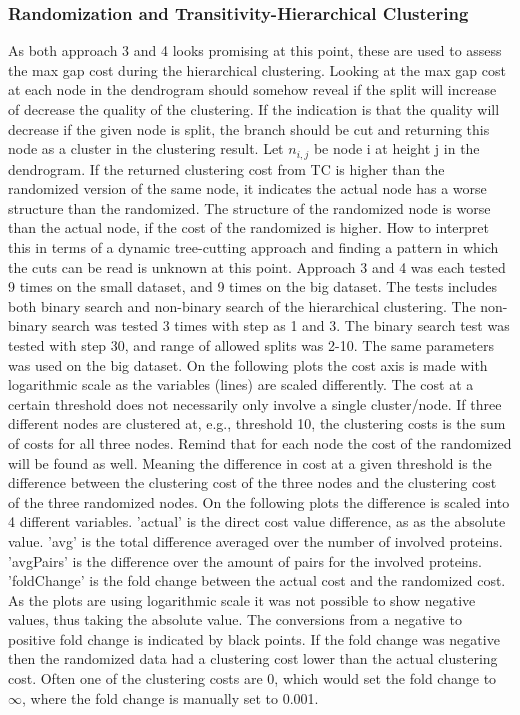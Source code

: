 \documentclass[a4paper,10pt]{article}
\theoremstyle{plain}
\theoremstyle{definition}
\begin{document}
\subsubsection{Randomization and Transitivity-Hierarchical Clustering}
As both approach 3 and 4 looks promising at this point, these are used to assess the max gap cost during the hierarchical clustering. Looking at the max gap cost at each node in the dendrogram should somehow reveal if the split will increase of decrease the quality of the clustering. If the indication is that the quality will decrease if the given node is split, the branch should be cut and returning this node as a cluster in the clustering result. Let $n_{i,j}$ be node i at height j in the dendrogram. If the returned clustering cost from TC is higher than the randomized version of the same node, it indicates the actual node has a worse structure than the randomized. The structure of the randomized node is worse than the actual node, if the cost of the randomized is higher. How to interpret this in terms of a dynamic tree-cutting approach and finding a pattern in which the cuts can be read is unknown at this point. 
Approach 3 and 4 was each tested 9 times on the small dataset, and 9 times on the big dataset. The tests includes both binary search and non-binary search of the hierarchical clustering. The non-binary search was tested 3 times with step as 1 and 3. The binary search test was tested with step 30, and range of allowed splits was 2-10. The same parameters was used on the big dataset. On the following plots the cost axis is made with logarithmic scale as the variables (lines) are scaled differently. The cost at a certain threshold does not necessarily only involve a single cluster/node. If three different nodes are clustered at, e.g., threshold 10, the clustering costs is the sum of costs for all three nodes. Remind that for each node the cost of the randomized will be found as well. Meaning the difference in cost at a given threshold is the difference between the clustering cost of the three nodes and the clustering cost of the three randomized nodes.
On the following plots the difference is scaled into 4 different variables. 'actual' is the direct cost value difference, as as the absolute value. 'avg' is the total difference averaged over the number of involved proteins. 'avgPairs' is the difference over the amount of pairs for the involved proteins. 'foldChange' is the fold change between the actual cost and the randomized cost. As the plots are using logarithmic scale it was not possible to show negative values, thus taking the absolute value. The conversions from a negative to positive fold change is indicated by black points. If the fold change was negative then the randomized data had a clustering cost lower than the actual clustering cost. Often one of the clustering costs are 0, which would set the fold change to $\infty$, where the fold change is manually set to 0.001.
\end{document}

